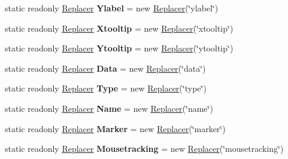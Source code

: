 \begin{DoxyCompactItemize}
static readonly \hyperlink{classHighcharts_1_1Replacer}{Replacer} {\bfseries Ylabel} = new \hyperlink{classHighcharts_1_1Replacer}{Replacer}(\char`\"{}ylabel\char`\"{})
\item 
\mbox{\label{classHighcharts_1_1Replacer_aeb6f8d0d38f280410865706032c317bd}} 
static readonly \hyperlink{classHighcharts_1_1Replacer}{Replacer} {\bfseries Xtooltip} = new \hyperlink{classHighcharts_1_1Replacer}{Replacer}(\char`\"{}xtooltip\char`\"{})
\item 
\mbox{\label{classHighcharts_1_1Replacer_aa5e813b3a470a67079475649f889835c}} 
static readonly \hyperlink{classHighcharts_1_1Replacer}{Replacer} {\bfseries Ytooltip} = new \hyperlink{classHighcharts_1_1Replacer}{Replacer}(\char`\"{}ytooltip\char`\"{})
\item 
\mbox{\label{classHighcharts_1_1Replacer_a52d1f0bff1a408bbf9c666a46099f821}} 
static readonly \hyperlink{classHighcharts_1_1Replacer}{Replacer} {\bfseries Data} = new \hyperlink{classHighcharts_1_1Replacer}{Replacer}(\char`\"{}data\char`\"{})
\item 
\mbox{\label{classHighcharts_1_1Replacer_a8122a2330b8cfeb8c78cdc5cf35e2de8}} 
static readonly \hyperlink{classHighcharts_1_1Replacer}{Replacer} {\bfseries Type} = new \hyperlink{classHighcharts_1_1Replacer}{Replacer}(\char`\"{}type\char`\"{})
\item 
\mbox{\label{classHighcharts_1_1Replacer_a8c5268c2c4eca614cb2f65e8d0e2b663}} 
static readonly \hyperlink{classHighcharts_1_1Replacer}{Replacer} {\bfseries Name} = new \hyperlink{classHighcharts_1_1Replacer}{Replacer}(\char`\"{}name\char`\"{})
\item 
\mbox{\label{classHighcharts_1_1Replacer_a20e54647f393c33a98b462a8b58150ea}} 
static readonly \hyperlink{classHighcharts_1_1Replacer}{Replacer} {\bfseries Marker} = new \hyperlink{classHighcharts_1_1Replacer}{Replacer}(\char`\"{}marker\char`\"{})
\item 
\mbox{\label{classHighcharts_1_1Replacer_aa90e20f20aa31ed3377d49392063e356}} 
static readonly \hyperlink{classHighcharts_1_1Replacer}{Replacer} {\bfseries Mousetracking} = new \hyperlink{classHighcharts_1_1Replacer}{Replacer}(\char`\"{}mousetracking\char`\"{})
\end{DoxyCompactItemize}
